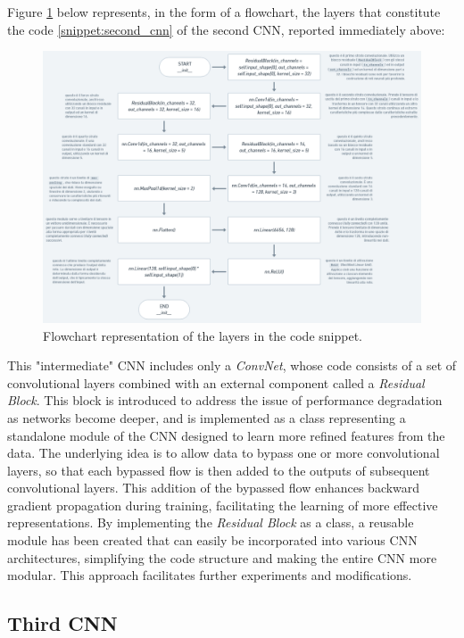 \documentclass[12pt,english]{report}
\begin{document}
Figure \ref{fig:second_cnn_layers} below represents, in the form of a flowchart, the layers that constitute the code \ref{snippet:second_cnn} of the second CNN, reported immediately above:

\begin{figure}[H]
    \centering
    \includegraphics[width=1\textwidth]{images/second_cnn_layers.png}
    \captionsetup{justification=centering}
    \caption{Flowchart representation of the layers in the code snippet.}
    \label{fig:second_cnn_layers}
\end{figure}

This "intermediate" CNN includes only a \textit{ConvNet}, whose code consists of a set of convolutional layers combined with an external component called a \textit{Residual Block}. This block is introduced to address the issue of performance degradation as networks become deeper, and is implemented as a class representing a standalone module of the CNN designed to learn more refined features from the data. The underlying idea is to allow data to bypass one or more convolutional layers, so that each bypassed flow is then added to the outputs of subsequent convolutional layers. This addition of the bypassed flow enhances backward gradient propagation during training, facilitating the learning of more effective representations.
By implementing the \textit{Residual Block} as a class, a reusable module has been created that can easily be incorporated into various CNN architectures, simplifying the code structure and making the entire CNN more modular. This approach facilitates further experiments and modifications.

\subsection{Third CNN}
\label{subsec:third_cnn}
\end{document}
